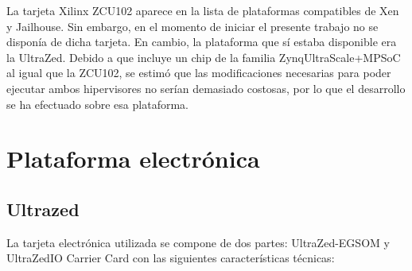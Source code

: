 La tarjeta Xilinx ZCU102 aparece en la lista de plataformas compatibles de Xen y Jailhouse. Sin embargo, en el momento de iniciar el presente trabajo no se disponía de dicha tarjeta. En cambio, la plataforma que sí estaba disponible era la UltraZed\texttrademark. Debido a que incluye un chip de la familia Zynq\textregistered UltraScale+\texttrademark MPSoC al igual que la ZCU102, se estimó que las modificaciones necesarias para poder ejecutar ambos hipervisores no serían demasiado costosas, por lo que el desarrollo se ha efectuado sobre esa plataforma.

\section{Plataforma electrónica}
\subsection{Ultrazed\texttrademark}
La tarjeta electrónica utilizada se compone de dos partes: UltraZed-EG\texttrademark \acrshort{SOM} y UltraZed\texttrademark IO Carrier Card con las siguientes características técnicas:
